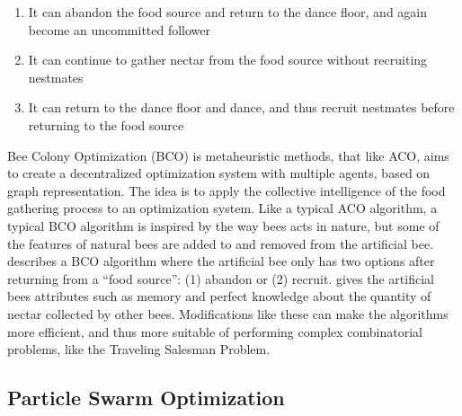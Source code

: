 \begin{enumerate}
  \item It can abandon the food source and return to the dance floor, and again become an uncommitted follower
  \item It can continue to gather nectar from the food source without recruiting nestmates
  \item It can return to the dance floor and dance, and thus recruit nestmates before returning to the food source
\end{enumerate}

Bee Colony Optimization (BCO) is metaheuristic methods, that like ACO, aims to create a decentralized optimization system with multiple agents, based on graph representation. The idea is to apply the collective intelligence of the food gathering process to an optimization system. Like a typical ACO algorithm, a typical BCO algorithm is inspired by the way bees acts in nature, but some of the features of natural bees are added to and removed from the artificial bee. \citet{nikolic14} describes a BCO algorithm where the artificial bee only has two options after returning from a ``food source'': (1) abandon or (2) recruit. \citet{lucic03} gives the artificial bees attributes such as memory and perfect knowledge about the quantity of nectar collected by other bees. Modifications like these can make the algorithms more efficient, and thus more suitable of performing complex combinatorial problems, like the Traveling Salesman Problem. 


\subsection{Particle Swarm Optimization}


